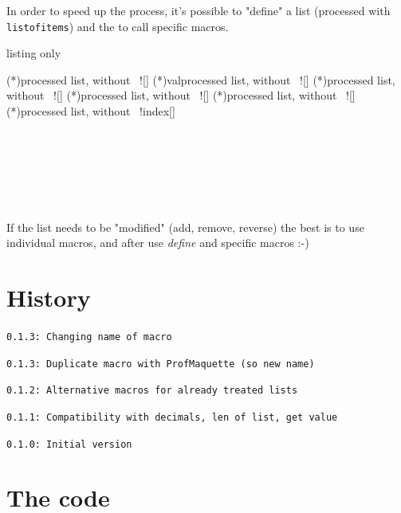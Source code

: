 \documentclass[11pt,a4paper]{ltxdoc}
\begin{document}
In order to speed up the process, it's possible to "define" a list (processed with \texttt{listofitems}) and the to call specific macros.

\begin{DemoCode}{listing only}

\lenofdeflist(*){processed list, without \ !}[\macro]
\countvalindeflist(*){val}{processed list, without \ !}[\macro]
\meanofdeflist(*){processed list, without \ !}[\macro]
\sumofdeflist(*){processed list, without \ !}[\macro]
\prodofdeflist(*){processed list, without \ !}[\macro]
\getvaluefromdeflist(*){processed list, without \ !}{index}[\macro]
\end{DemoCode}

\begin{DemoCode}{}
\showitems{\mydeflist}

\\
\\
\\
\\
\\
\end{DemoCode}

If the list needs to be "modified" (add, remove, reverse) the best is to use individual macros, and after use \textit{define} and specific macros :-)

\pagebreak

\section{History}

\texttt{0.1.3: Changing name of macro}

\texttt{0.1.3: Duplicate macro with ProfMaquette (so new name)}

\texttt{0.1.2: Alternative macros for already treated lists}

\texttt{0.1.1: Compatibility with decimals, len of list, get value}

\texttt{0.1.0: Initial version}

\section{The code}

\end{document}
